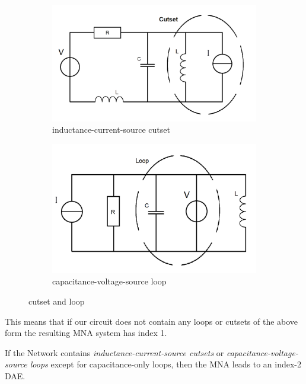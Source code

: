 \begin{figure}[H]
	\begin{subfigure}{0.5\textwidth}
		\centering
		\includegraphics[width=0.9\linewidth]{pictures/inductance-current-source_cutset.png}
		\caption{inductance-current-source cutset}
	\end{subfigure}
	\begin{subfigure}{0.5\textwidth}
		\centering
		\includegraphics[width=0.9\linewidth]{pictures/capacitance-voltage-source_loop.png}
		\caption{capacitance-voltage-source loop}
	\end{subfigure}
	\label{cutset and loop}
	\caption{cutset and loop}
\end{figure}

This means that if our circuit does not contain any loops or cutsets of the above form the resulting MNA system has index 1.

\begin{theorem} \label{Index-2 condition}
	If the Network contains \emph{inductance-current-source cutsets} or \emph{capacitance-voltage-source loops} except for capacitance-only loops, then the MNA leads to an index-2 DAE.
\end{theorem}


